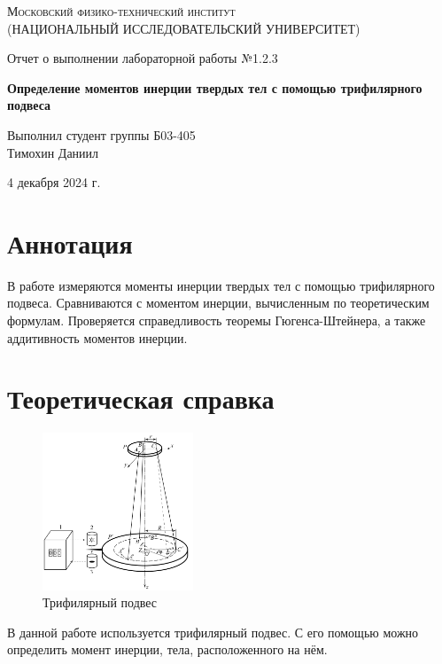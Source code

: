\documentclass[12pt,a4paper]{article}
\def \TITLE {Отчет о выполнении лабораторной работы №1.2.3}
\def \SUBTITLE {Определение моментов инерции твердых тел с помощью трифилярного подвеса}
\def \AUTHOR {Выполнил студент группы Б03-405\\ Тимохин Даниил}
\def \DATE {4 декабря 2024 г.}
\begin{document}
\begin{titlepage}
	\centering
	\vspace{5cm}
	{\scshape\large Московский физико-технический институт \\
	(НАЦИОНАЛЬНЫЙ ИССЛЕДОВАТЕЛЬСКИЙ УНИВЕРСИТЕТ)}
	
	\vspace{4cm}
	{\LARGE \TITLE}
	
	\vspace{1cm}
	{\Huge\bf \SUBTITLE }
	
	\vspace{1cm}
	\vfill
	
\begin{flushright}
	{\LARGE \AUTHOR}
\end{flushright}
	

	\vfill

	\DATE
\end{titlepage}

\newpage

\fontsize{12}{14}\selectfont

\section{ Аннотация}
В работе измеряются моменты инерции твердых тел с помощью трифилярного подвеса. Сравниваются с моментом инерции, вычисленным по теоретическим формулам. Проверяется справедливость теоремы Гюгенса-Штейнера, а также аддитивность моментов инерции. 

\section{ Теоретическая справка}

\begin{figure}
    \includegraphics[width=0.4\textwidth]{imgs/ustan.png}
    \caption{Трифилярный подвес}
    \label{fig:ust1}
\end{figure}
В данной работе используется трифилярный подвес. С его помощью можно определить момент инерции, тела, расположенного на нём.
\end{document}
